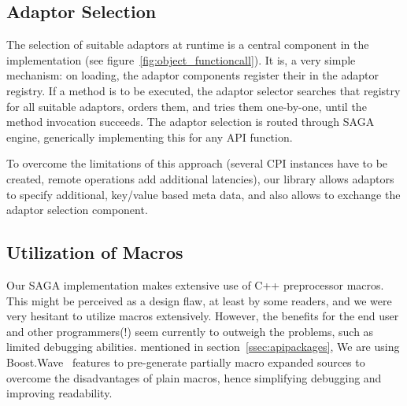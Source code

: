 \subsection{Adaptor Selection}

The selection of suitable adaptors at runtime  is a central
component in the implementation (see
figure~\ref{fig:object_functioncall}).  It is, a very simple
mechanism: on loading, the adaptor components register their
 in the adaptor registry.  If a method is to be
executed, the adaptor selector searches that registry for all 
suitable adaptors, orders them, and tries them one-by-one,
until the method invocation succeeds. The adaptor selection is 
routed through SAGA engine, generically implementing this for 
any API function.

To overcome the limitations of this approach (several CPI instances 
have to be created, remote operations add  additional latencies), our 
library allows adaptors to specify additional, key/value
based meta data, and also allows to exchange the adaptor selection
component.

\subsection{Utilization of Macros}
\label{ssec:macros}

Our SAGA implementation makes extensive use of C++ preprocessor
macros.  This might be perceived as a design flaw, at least by
some readers, and we were very hesitant to utilize macros
extensively.  However, the benefits for the end user
and other programmers(!) seem currently to outweigh the problems, 
such as limited debugging abilities.
mentioned in section~\ref{ssec:apipackages}, We are using Boost.Wave~\cite{boost_website}
features to pre-generate partially macro expanded sources to overcome 
the disadvantages of plain macros, hence simplifying debugging and 
improving readability.
